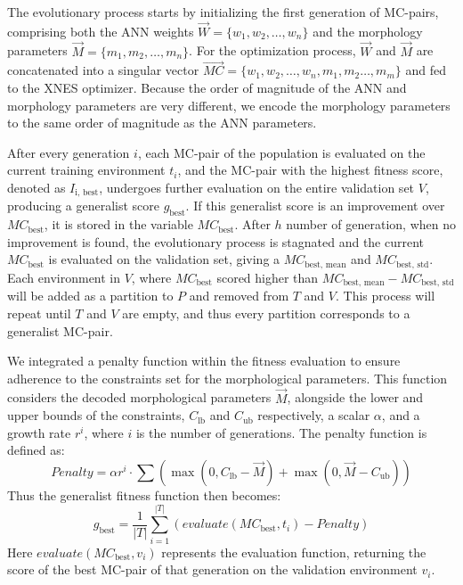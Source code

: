         The evolutionary process starts by initializing the first generation of MC-pairs, comprising both the ANN weights $\overrightarrow{W} = \{w_1, w_2, \ldots, w_n\}$ and the morphology parameters $\overrightarrow{M} = \{m_1, m_2, \ldots, m_n\}$. For the optimization process, $\overrightarrow{W}$ and $\overrightarrow{M}$ are concatenated into a singular vector \newline $\overrightarrow{MC} = \{w_1, w_2, \ldots, w_n, m_1, m_2 \ldots, m_m\}$ and fed to the XNES optimizer. Because the order of magnitude of the ANN and morphology parameters are very different, we encode the morphology parameters to the same order of magnitude as the ANN parameters.

        After every generation $i$, each MC-pair of the population is evaluated on the current training environment $t_i$, and the MC-pair with the highest fitness score, denoted as $I_{\text{i, best}}$, undergoes further evaluation on the entire validation set $V$, producing a generalist score $g_{\text{best}}$. If this generalist score is an improvement over $MC_{\text{best}}$, it is stored in the variable $MC_{\text{best}}$. After $h$ number of generation, when no improvement is found, the evolutionary process is stagnated and the current $MC_{\text{best}}$ is evaluated on the validation set, giving a $MC_{\text{best, mean}}$ and $MC_{\text{best, std}}$. Each environment in $V$, where $MC_{\text{best}}$ scored higher than $MC_{\text{best, mean}} - MC_{\text{best, std}}$ will be added as a partition to $P$ and removed from $T$ and $V$. This process will repeat until $T$ and $V$ are empty, and thus every partition corresponds to a generalist MC-pair. 

        We integrated a penalty function within the fitness evaluation to ensure adherence to the constraints set for the morphological parameters. This function considers the decoded morphological parameters $\overrightarrow{M}$, alongside the lower and upper bounds of the constraints, $C_\text{lb}$ and $C_\text{ub}$ respectively, a scalar $\alpha$, and a growth rate $r^i$, where $i$ is the number of generations. The penalty function is defined as:
        {\small
            \begin{equation}
                Penalty = \alpha r^i \cdot \sum(
                    \max(0, C_\text{lb} - \overrightarrow{M}) + 
                    \max(0, \overrightarrow{M} - C_\text{ub})
                )
            \end{equation}
        }
        Thus the generalist fitness function then becomes:
        {\small
            \begin{equation}
                g_{\text{best}} = \frac{1}{|T|} \sum_{i=1}^{|T|}(
                    evaluate(MC_{\text{best}}, t_i) - Penalty
                ) 
            \end{equation}
        }
        Here $evaluate(MC_{\text{best}}, v_i)$ represents the evaluation function, returning the score of the best MC-pair of that generation on the validation environment $v_i$.

